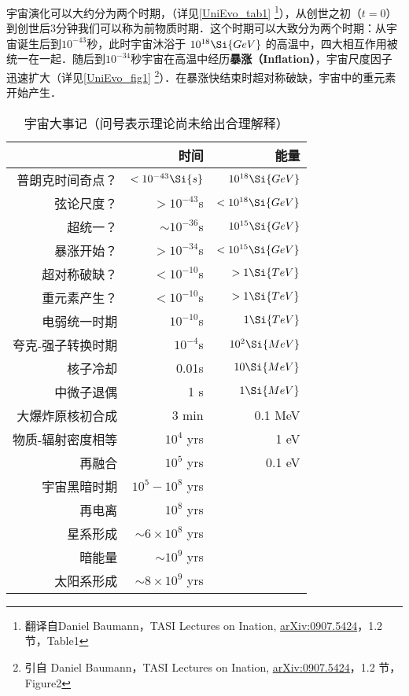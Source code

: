 
宇宙演化可以大约分为两个时期，（详见\autoref{UniEvo_tab1} \footnote{翻译自Daniel Baumann，TASI Lectures on Ination, \href{https://arxiv.org/abs/0907.5424}{arXiv:0907.5424}，1.2 节，Table1}），从创世之初（$t=0$） 到创世后3分钟我们可以称为前物质时期．这个时期可以大致分为两个时期：从宇宙诞生后到$10^{-43}$秒，此时宇宙沐浴于 $10^{18}\Si{GeV}$ 的高温中，四大相互作用被统一在一起．随后到$10^{-34}$秒宇宙在高温中经历\textbf{暴涨（Inflation）}，宇宙尺度因子迅速扩大（详见\autoref{UniEvo_fig1} \footnote{引自 Daniel Baumann，TASI Lectures on Ination, \href{https://arxiv.org/abs/0907.5424}{arXiv:0907.5424}，1.2 节，Figure2}）．在暴涨快结束时超对称破缺，宇宙中的重元素开始产生．

\begin{table}[ht]
\centering
\caption{宇宙大事记（问号表示理论尚未给出合理解释）}\label{UniEvo_tab1}
\begin{tabular}{|r|r|r|}
\hline
 & 时间 & 能量 \\
\hline
普朗克时间奇点？ & $<10^{-43}\Si{s}$ & $10^{18}\Si{GeV}$ \\
\hline
弦论尺度？       & $>10^{-43}$s & $<10^{18}\Si{GeV}$ \\
\hline
超统一？         & $\sim 10^{-36}$s & $10^{15}\Si{GeV}$ \\
\hline
暴涨开始？       & $>10^{-34}$s & $<10^{15} \Si{GeV}$ \\
\hline
超对称破缺？     & $<10^{-10}$s & $>1 \Si{TeV}$ \\
\hline
重元素产生？     & $<10^{-10}$s & $>1 \Si{TeV}$ \\
\hline
电弱统一时期    & $10^{-10}$s & $1 \Si{TeV}$ \\
\hline
夸克-强子转换时期 & $10^{-4}$s & $10^2 \Si{MeV}$ \\
\hline
核子冷却        & 0.01s & $10 \Si{MeV}$ \\
\hline
中微子退偶      & 1 s  & $1 \Si{MeV}$ \\
\hline
大爆炸原核初合成  & 3 min & 0.1 MeV \\
\hline
物质-辐射密度相等 & $10^4$ yrs  & 1 eV \\
\hline
再融合 & $10^5$ yrs  & 0.1 eV \\
\hline
宇宙黑暗时期 & $10^5 - 10^8$ yrs  &  \\
\hline
再电离 & $10^8$ yrs  &  \\
\hline
星系形成 & $\sim 6 \times 10^8$ yrs  &  \\
\hline
暗能量 & $\sim 10^9$  yrs  &  \\
\hline
太阳系形成 & $ \sim 8 \times 10^9  $ yrs  &  \\
\hline
\end{tabular}
\end{table}


